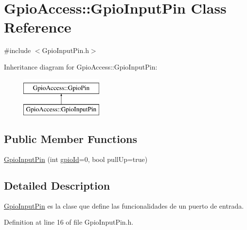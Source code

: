 \hypertarget{class_gpio_access_1_1_gpio_input_pin}{\section{\-Gpio\-Access\-:\-:\-Gpio\-Input\-Pin \-Class \-Reference}
\label{class_gpio_access_1_1_gpio_input_pin}
}


{\ttfamily \#include $<$\-Gpio\-Input\-Pin.\-h$>$}

\-Inheritance diagram for \-Gpio\-Access\-:\-:\-Gpio\-Input\-Pin\-:\begin{figure}[H]
\begin{center}
\leavevmode
\includegraphics[height=2.000000cm]{class_gpio_access_1_1_gpio_input_pin}
\end{center}
\end{figure}
\subsection*{\-Public \-Member \-Functions}
\begin{DoxyCompactItemize}
\item 
\hyperlink{class_gpio_access_1_1_gpio_input_pin_a32dbeb898419c64462d4f136bea92221}{\-Gpio\-Input\-Pin} (int \hyperlink{class_gpio_access_1_1_gpio_pin_a662d9f6e22d338e0b182b3220a42f25d}{gpio\-Id}=0, bool pull\-Up=true)
\end{DoxyCompactItemize}


\subsection{\-Detailed \-Description}
\hyperlink{class_gpio_access_1_1_gpio_input_pin}{\-Gpio\-Input\-Pin} es la clase que define las funcionalidades de un puerto de entrada. 

\-Definition at line 16 of file \-Gpio\-Input\-Pin.\-h.



